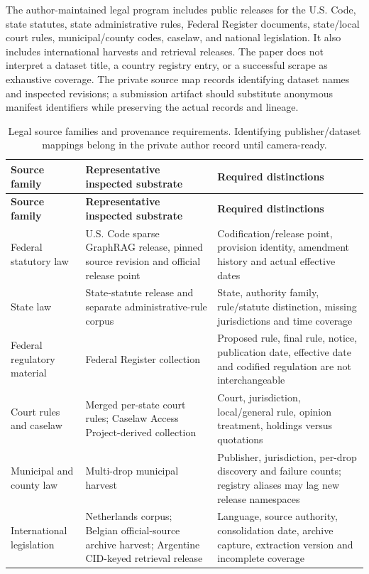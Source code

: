 \documentclass{article}
\begin{document}
The author-maintained legal program includes public releases for the U.S. Code, state statutes, state administrative rules, Federal Register documents, state/local court rules, municipal/county codes, caselaw, and national legislation. It also includes international harvests and retrieval releases. The paper does not interpret a dataset title, a country registry entry, or a successful scrape as exhaustive coverage. The private source map records identifying dataset names and inspected revisions; a submission artifact should substitute anonymous manifest identifiers while preserving the actual records and lineage.
\begingroup
\renewcommand{\thetable}{A1}
\begin{longtable}{@{}>{\raggedright\arraybackslash}p{.24\linewidth} >{\raggedright\arraybackslash}p{.32\linewidth} >{\raggedright\arraybackslash}p{.38\linewidth}@{}}
\caption{Legal source families and provenance requirements. Identifying publisher/dataset mappings belong in the private author record until camera-ready.}\label{tab:A1}\\
\toprule
\textbf{Source family} & \textbf{Representative inspected substrate} & \textbf{Required distinctions} \\
\midrule
\endfirsthead
\textbf{Source family} & \textbf{Representative inspected substrate} & \textbf{Required distinctions} \\
\midrule
\endhead
\bottomrule
\endlastfoot
Federal statutory law & U.S. Code sparse GraphRAG release, pinned source revision and official release point & Codification/release point, provision identity, amendment history and actual effective dates \\[3pt]
State law & State-statute release and separate administrative-rule corpus & State, authority family, rule/statute distinction, missing jurisdictions and time coverage \\[3pt]
Federal regulatory material & Federal Register collection & Proposed rule, final rule, notice, publication date, effective date and codified regulation are not interchangeable \\[3pt]
Court rules and caselaw & Merged per-state court rules; Caselaw Access Project-derived collection & Court, jurisdiction, local/general rule, opinion treatment, holdings versus quotations \\[3pt]
Municipal and county law & Multi-drop municipal harvest & Publisher, jurisdiction, per-drop discovery and failure counts; registry aliases may lag new release namespaces \\[3pt]
International legislation & Netherlands corpus; Belgian official-source archive harvest; Argentine CID-keyed retrieval release & Language, source authority, consolidation date, archive capture, extraction version and incomplete coverage \\[3pt]
\end{longtable}
\endgroup
\end{document}
